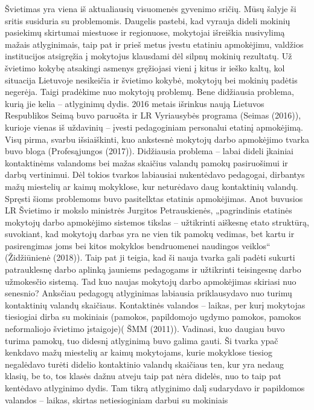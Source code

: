 \documentclass[]{article}
\begin{document}
Švietimas yra viena iš aktualiausių visuomenės gyvenimo sričių. Mūsų
šalyje ši sritis susiduria su problemomis. Daugelis pastebi, kad vyrauja
dideli mokinių pasiekimų skirtumai miestuose ir regionuose, mokytojai
išreiškia nusivylimą mažais atlyginimais, taip pat ir prieš metus įvestu
etatiniu apmokėjimu, valdžios institucijos atsigręžia į mokytojus
klausdami dėl silpnų mokinių rezultatų. Už švietimo kokybę atsakingi
asmenys gręžiojasi vieni į kitus ir ieško kaltų, kol situacija Lietuvoje
nesikeičia ir švietimo kokybė, mokytojų bei mokinių padėtis negerėja.
Taigi pradėkime nuo mokytojų problemų. Bene didžiausia problema, kurią
jie kelia -- atlyginimų dydis. 2016 metais išrinkus naują Lietuvos
Respublikos Seimą buvo paruošta ir LR Vyriausybės programa (Seimas
(2016)), kurioje vienas iš uždavinių -- įvesti pedagoginiam personalui
etatinį apmokėjimą. Visų pirma, svarbu išsiaiškinti, kuo ankstesnė
mokytojų darbo apmokėjimo tvarka buvo bloga (Profesąjungos (2017)).
Didžiausia problema -- labai dideli įkainiai kontaktinėms valandoms bei
mažas skaičius valandų pamokų pasiruošimui ir darbų vertinimui. Dėl
tokios tvarkos labiausiai nukentėdavo pedagogai, dirbantys mažų
miestelių ar kaimų mokyklose, kur neturėdavo daug kontaktinių valandų.
Spręsti šioms problemoms buvo pasitelktas etatinis apmokėjimas. Anot
buvusios LR Švietimo ir mokslo ministrės Jurgitos Petrauskienės,
„pagrindinis etatinės mokytojų darbo apmokėjimo sistemos tikslas --
užtikrinti aiškesnę etato struktūrą, suvokiant, kad mokytojų darbas yra
ne vien tik pamokų vedimas, bet kartu ir pasirengimas joms bei kitos
mokyklos bendruomenei naudingos veiklos`` (Židžiūnienė (2018)). Taip pat
ji teigia, kad ši nauja tvarka gali padėti sukurti patrauklesnę darbo
aplinką jauniems pedagogams ir užtikrinti teisingesnę darbo užmokesčio
sistemą. Tad kuo naujas mokytojų darbo apmokėjimas skiriasi nuo
senesnio? Anksčiau pedagogų atlyginimas labiausia priklausydavo nuo
turimų kontaktinių valandų skaičiaus. Kontaktinės valandos -- laikas,
per kurį mokytojas tiesiogiai dirba su mokiniais (pamokos, papildomojo
ugdymo pamokos, pamokos neformaliojo švietimo įstaigoje)( ŠMM (2011)).
Vadinasi, kuo daugiau buvo turima pamokų, tuo didesnį atlyginimą buvo
galima gauti. Ši tvarka ypač kenkdavo mažų miestelių ar kaimų
mokytojams, kurie mokyklose tiesiog negalėdavo turėti didelio
kontaktinio valandų skaičiaus ten, kur yra nedaug klasių, be to, tos
klasės dažnu atveju taip pat nėra didelės, nuo to taip pat kentėdavo
atlyginimo dydis. Tam tikrą atlyginimo dalį sudarydavo ir papildomos
valandos -- laikas, skirtas netiesioginiam darbui su mokiniais
\end{document}
